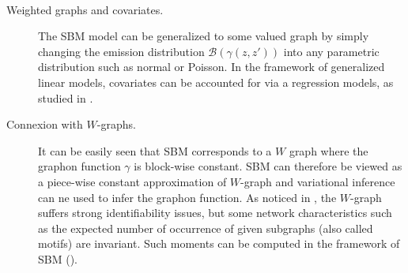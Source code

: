 \documentclass{svmult}
\renewcommand{\paragraph}[1]{~\\ \noindent {\bf #1}}
\begin{document}
\paragraph{Extension of SBM}

\begin{description}
  \item[Weighted graphs and covariates.]
  The SBM model can be generalized to some valued graph by simply changing the emission distribution $\mathcal B(\gamma(z, z'))$ into any parametric distribution such as normal or Poisson. In the framework of generalized linear models, covariates can be accounted for via a regression models, as studied in \cite{MRV10}.
  \item[Connexion with $W$-graphs.]
  It can be easily seen that SBM corresponds to a $W$ graph where the graphon function $\gamma$ is block-wise constant. SBM can therefore be viewed as a piece-wise constant approximation of $W$-graph and variational inference can ne used to infer the graphon function. As noticed in \cite{ChD11}, the $W$-graph suffers strong identifiability issues, but some network characteristics such as the expected number of occurrence of given subgraphs (also called motifs) are invariant. Such moments can be computed in the framework of SBM (\cite{PDK08}).
\end{description}




\end{document}
